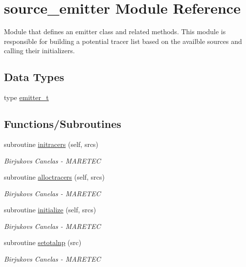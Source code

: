\hypertarget{namespacesource__emitter}{}\section{source\+\_\+emitter Module Reference}
\label{namespacesource__emitter}


Module that defines an emitter class and related methods. This module is responsible for building a potential tracer list based on the availble sources and calling their initializers.  


\subsection*{Data Types}
\begin{DoxyCompactItemize}
\item 
type \mbox{\hyperlink{structsource__emitter_1_1emitter__t}{emitter\+\_\+t}}
\end{DoxyCompactItemize}
\subsection*{Functions/\+Subroutines}
\begin{DoxyCompactItemize}
\item 
subroutine \mbox{\hyperlink{namespacesource__emitter_a2fb64d19c0016b31bd9dab0a13785d61}{initracers}} (self, srcs)
\begin{DoxyCompactList}\small\item\em Birjukovs Canelas -\/ M\+A\+R\+E\+T\+EC \end{DoxyCompactList}\item 
subroutine \mbox{\hyperlink{namespacesource__emitter_a54e88b7aa868ff9de8cf018208a20585}{alloctracers}} (self, srcs)
\begin{DoxyCompactList}\small\item\em Birjukovs Canelas -\/ M\+A\+R\+E\+T\+EC \end{DoxyCompactList}\item 
subroutine \mbox{\hyperlink{namespacesource__emitter_a6400b97541c15fcf0ec523b359aacac9}{initialize}} (self, srcs)
\begin{DoxyCompactList}\small\item\em Birjukovs Canelas -\/ M\+A\+R\+E\+T\+EC \end{DoxyCompactList}\item 
subroutine \mbox{\hyperlink{namespacesource__emitter_a73d054a39fc1fccfde74173a5c7f2c58}{setotalnp}} (src)
\begin{DoxyCompactList}\small\item\em Birjukovs Canelas -\/ M\+A\+R\+E\+T\+EC \end{DoxyCompactList}\end{DoxyCompactItemize}

